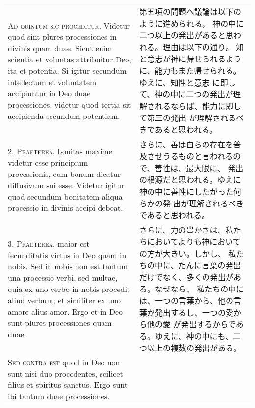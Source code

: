 \documentclass[10pt]{jsarticle} %
\begin{document}
\begin{longtable}{p{21em}p{21em}}



{\Huge A}{\scshape d quintum sic proceditur}. Videtur quod sint plures processiones in
 divinis quam duae. Sicut enim scientia et voluntas attribuitur Deo, ita
 et potentia. Si igitur secundum intellectum et voluntatem accipiuntur
 in Deo duae processiones, videtur quod tertia sit accipienda secundum
 potentiam.

&

第五項の問題へ議論は以下のように進められる。
神の中に二つ以上の発出があると思われる。理由は以下の通り。
知と意志が神に帰せられるように、能力もまた帰せられる。ゆえに、知性と意志
 に即して、神の中に二つの発出が理解されるならば、能力に即して第三の発出
 が理解されるべきであると思われる。

\\



2. {\scshape Praeterea}, bonitas maxime videtur esse principium processionis, cum
 bonum dicatur diffusivum sui esse. Videtur igitur quod secundum
 bonitatem aliqua processio in divinis accipi debeat.

&

さらに、善は自らの存在を普及させうるものと言われるので、善性は、最大限に、
 発出の根源だと思われる。ゆえに神の中に善性にしたがった何らかの発
 出が理解されるべきであると思われる。

\\



3. {\scshape Praeterea}, maior est fecunditatis virtus in Deo quam in nobis. Sed in
 nobis non est tantum una processio verbi, sed multae, quia ex uno verbo
 in nobis procedit aliud verbum; et similiter ex uno amore alius
 amor. Ergo et in Deo sunt plures processiones quam duae.

&

さらに、力の豊かさは、私たちにおいてよりも神においての方が大きい。しかし、
 私たちの中に、たんに言葉の発出だけでなく、多くの発出がある。なぜなら、
私たちの中には、一つの言葉から、他の言葉が発出するし、一つの愛から他の愛
 が発出するからである。ゆえに、神の中にも、二つ以上の複数の発出がある。


\\



{\scshape Sed contra est} quod in Deo non sunt nisi duo procedentes, scilicet
 filius et spiritus sanctus. Ergo sunt ibi tantum duae processiones.


\end{longtable}
\end{document}
